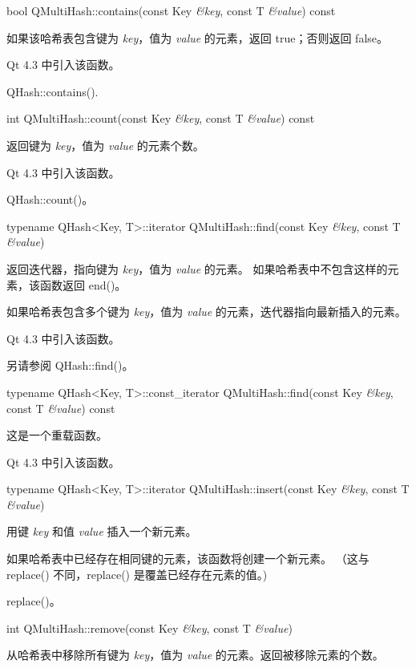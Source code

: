 bool QMultiHash::contains(const Key \emph{\&key}, const T \emph{\&value}) const

如果该哈希表包含键为 \emph{key}，值为 \emph{value} 的元素，返回 true；否则返回 false。

Qt 4.3 中引入该函数。

\begin{seeAlso}
QHash::contains().
\end{seeAlso}

int QMultiHash::count(const Key \emph{\&key}, const T \emph{\&value}) const

返回键为 \emph{key}，值为 \emph{value} 的元素个数。

Qt 4.3 中引入该函数。

\begin{seeAlso}
QHash::count()。
\end{seeAlso}

typename QHash<Key, T>::iterator QMultiHash::find(const Key \emph{\&key}, const T \emph{\&value})

返回迭代器，指向键为 \emph{key}，值为 \emph{value} 的元素。
如果哈希表中不包含这样的元素，该函数返回 end()。

如果哈希表包含多个键为  \emph{key}，值为 \emph{value} 的元素，迭代器指向最新插入的元素。

Qt 4.3 中引入该函数。

\begin{seeAlso}
另请参阅 QHash::find()。
\end{seeAlso}

typename QHash<Key, T>::const\_iterator QMultiHash::find(const Key \emph{\&key}, const T \emph{\&value}) const

这是一个重载函数。

Qt 4.3 中引入该函数。

typename QHash<Key, T>::iterator QMultiHash::insert(const Key \emph{\&key}, const T \emph{\&value})

用键 \emph{key} 和值 \emph{value} 插入一个新元素。

如果哈希表中已经存在相同键的元素，该函数将创建一个新元素。
（这与 replace() 不同，replace() 是覆盖已经存在元素的值。)

\begin{seeAlso}
replace()。
\end{seeAlso}

int QMultiHash::remove(const Key \emph{\&key}, const T \emph{\&value})

从哈希表中移除所有键为 \emph{key}，值为 \emph{value} 的元素。返回被移除元素的个数。

